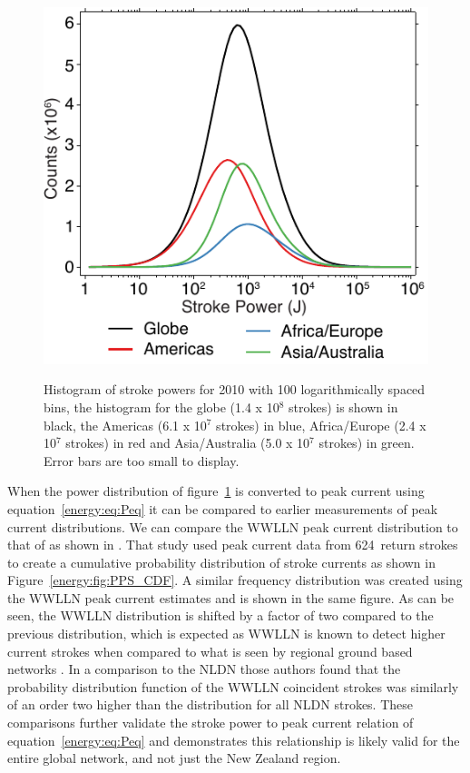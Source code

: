 \begin{figure}[ht!]
\centering
\includegraphics[scale=1]{energy/Figures/PPS_Distribution2.pdf}\\
\caption{Histogram of stroke powers for 2010 with 100 logarithmically spaced bins, the histogram for the globe (1.4 x 10$^8$ strokes) is shown in black, the Americas (6.1 x 10$^7$ strokes) in blue, Africa/Europe (2.4 x 10$^7$ strokes) in red and Asia/Australia (5.0 x 10$^7$ strokes) in green. Error bars are too small to display.}
\label{energy:fig:distribution}
\end{figure}
 
When the power distribution of figure~\ref{energy:fig:distribution} is converted to peak current using equation~\ref{energy:eq:Peq} it can be compared to earlier measurements of peak current distributions.
We can compare the WWLLN peak current distribution to that of \citet{Popolansky1972} as shown in \citet{Golde1977}.
That study used peak current data from 624~return strokes to create a cumulative probability distribution of stroke currents as shown in Figure~\ref{energy:fig:PPS_CDF}.
A similar frequency distribution was created using the WWLLN peak current estimates and is shown in the same figure.
As can be seen, the WWLLN distribution is shifted by a factor of two compared to the previous distribution, which is expected as WWLLN is known to detect higher current strokes when compared to what is seen by regional ground based networks \citep{Abarca2010}.
In a comparison to the NLDN those authors found that the probability distribution function of the WWLLN coincident strokes was similarly of an order two higher than the distribution for all NLDN strokes.
These comparisons further validate the stroke power to peak current relation of equation~\ref{energy:eq:Peq} and demonstrates this relationship is likely valid for the entire global network, and not just the New Zealand region.

